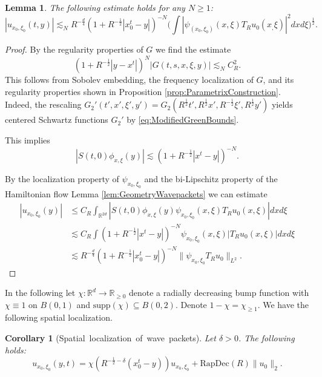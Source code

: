 \documentclass{amsart}
\newtheorem{corollary}[theorem]{Corollary}
\newtheorem{lemma}[theorem]{Lemma}
\theoremstyle{definition}
\newcommand{\R}{\mathbb{R}}
\begin{document}
\begin{lemma}
The following estimate holds for any $N \geq 1$:
\begin{equation*}
|u_{x_0,\xi_0}(t,y)| \lesssim_N R^{-\frac{d}{4}} (1+R^{-\frac{1}{2}}|x_0^t - y|)^{-N} \big( \int |\psi_{(x_0,\xi_0)}(x,\xi) T_R u_0(x_,\xi)|^2 dx d\xi \big)^{\frac{1}{2}}.
\end{equation*}
\end{lemma}
\begin{proof}
By the regularity properties of $G$ we find the estimate
\begin{equation*}
(1+ R^{-\frac{1}{2}} |y-x^t|)^N |G(t,s,x,\xi,y)| \lesssim_N C_R^2.
\end{equation*}
This follows from Sobolev embedding, the frequency localization of $G$, and its regularity properties shown in Proposition \ref{prop:ParametrixConstruction}. Indeed, the rescaling $G_2'(t',x',\xi',y') = G_2(R^{\frac{1}{2}} t', R^{\frac{1}{2}} x', R^{-\frac{1}{2}} \xi', R^{\frac{1}{2}} y')$ yields centered Schwartz functions $G_2'$ by \eqref{eq:ModifiedGreenBounds}.

This implies
\begin{equation*}
    |S(t,0) \phi_{x,\xi}(y)| \lesssim (1+ R^{-\frac{1}{2}} |x^t - y|)^{-N}.
\end{equation*}

By the localization property of $\psi_{x_0,\xi_0}$ and the bi-Lipschitz property of the Hamiltonian flow Lemma \ref{lem:GeometryWavepackets} we can estimate
\begin{equation*}
    \begin{split}
  |u_{x_0,\xi_0}(y) | &\leq  C_R \int_{\R^{2d}} | S(t,0) \phi_{x,\xi}(y) \psi_{x_0,\xi_0}(x,\xi) T_R u_0(x,\xi) | dx d\xi \\
  &\lesssim C_R \int (1+ R^{-\frac{1}{2}}|x^t-y|)^{-N} \psi_{x_0,\xi_0}(x,\xi) |T_R u_0(x,\xi)| dx d\xi \\
  &\lesssim R^{-\frac{d}{4}} (1+ R^{-\frac{1}{2}} |x_0^t - y|)^{-N} \| \psi_{x_0,\xi_0} T_R u_0 \|_{L^2}.
  \end{split}
\end{equation*}
\end{proof}

In the following let $\chi : \R^d \to \R_{\geq 0}$ denote a radially decreasing bump function with $\chi \equiv 1$ on $B(0,1)$ and $\text{supp}(\chi) \subseteq B(0,2)$. Denote $1 - \chi = \chi_{\geq 1}$. We have the following spatial localization.
\begin{corollary}[Spatial~localization~of~wave~packets]
\label{cor:SpatialLocalization}
Let $\delta > 0$. The following holds:
\begin{equation*}
u_{x_0,\xi_0}(y,t) = \chi(R^{-\frac{1}{2}-\delta}(x_0^t - y)) u_{x_0,\xi_0} + \text{RapDec}(R) \| u_0 \|_2.
\end{equation*}
\end{corollary}
\end{document}
